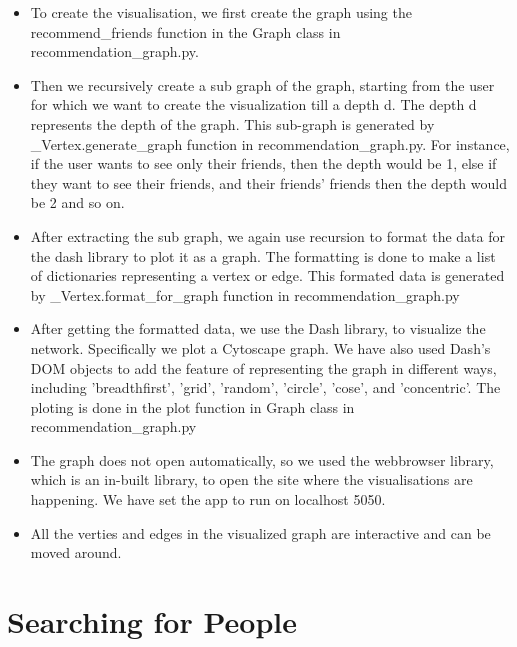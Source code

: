 \documentclass[11pt]{report}
\begin{document}
\begin{itemize}
    \item To create the visualisation, we first create the graph using the recommend\_friends function in the Graph class in recommendation\_graph.py.\\
    
    \item Then we recursively create a sub graph of the graph, starting from the user for which we want to create the visualization till a depth d. The depth d represents the depth of the graph. This sub-graph is generated by \_Vertex.generate\_graph function in recommendation\_graph.py. For instance, if the user wants to see only their friends, then the depth would be 1, else if they want to see their friends, and their friends' friends then the depth would be 2 and so on. \\
    
    \item After extracting the sub graph, we again use recursion to format the data for the dash library to plot it as a graph. The formatting is done to make a list of dictionaries representing a vertex or edge. This formated data is generated by \_Vertex.format\_for\_graph function in recommendation\_graph.py \\
    
    \item After getting the formatted data, we use the Dash library, to visualize the network. Specifically we plot a Cytoscape graph. We have also used Dash's DOM objects to add the feature of representing the graph in different ways, including 'breadthfirst', 'grid', 'random', 'circle', 'cose', and 'concentric'. The ploting is done in the plot function in Graph class in recommendation\_graph.py\\
    
    \item The graph does not open automatically, so we used the webbrowser library, which is an in-built library, to open the site where the visualisations are happening. We have set the app to run on localhost 5050. \\
    
    \item All the verties and edges in the visualized graph are interactive and can be moved around. 
\end{itemize}




\section{Searching for People}
\end{document}
